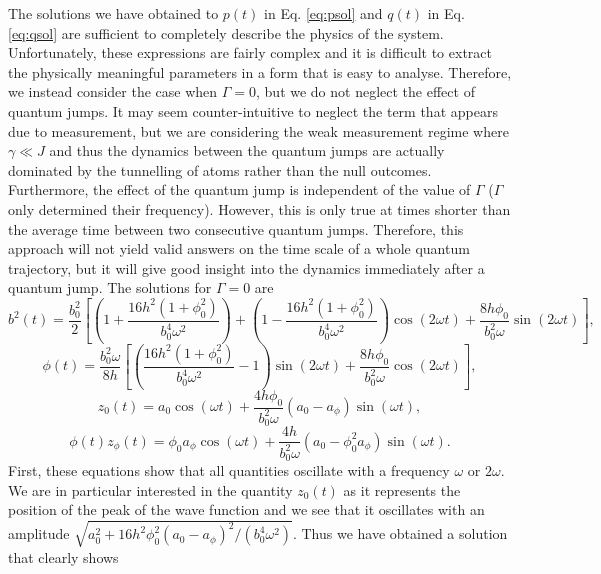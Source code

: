 The solutions we have obtained to $p(t)$ in Eq. \eqref{eq:psol} and
$q(t)$ in Eq. \eqref{eq:qsol} are sufficient to completely describe
the physics of the system. Unfortunately, these expressions are fairly
complex and it is difficult to extract the physically meaningful
parameters in a form that is easy to analyse. Therefore, we instead
consider the case when $\Gamma = 0$, but we do not neglect the effect
of quantum jumps. It may seem counter-intuitive to neglect the term
that appears due to measurement, but we are considering the weak
measurement regime where $\gamma \ll J$ and thus the
dynamics between the quantum jumps are actually dominated by the
tunnelling of atoms rather than the null outcomes. Furthermore, the
effect of the quantum jump is independent of the value of $\Gamma$
($\Gamma$ only determined their frequency). However, this is only true
at times shorter than the average time between two consecutive quantum
jumps. Therefore, this approach will not yield valid answers on the
time scale of a whole quantum trajectory, but it will give good
insight into the dynamics immediately after a quantum jump. The
solutions for $\Gamma = 0$ are
\begin{equation}
b^2(t) = \frac{b_0^2}{2} \left[ \left(1 + \frac{16 h^2 (1 + \phi_0^2)}
    {b_0^4 \omega^2} \right) + \left(1 - \frac{16 h^2 (1 + \phi_0^2)}
    {b_0^4 \omega^2} \right) \cos (2 \omega t) + \frac{8 h \phi_0}{b_0^2
    \omega} \sin(2 \omega t) \right],
\end{equation}
\begin{equation}
  \phi(t) = \frac{b_0^2 \omega} {8 h} \left[ \left( \frac{16 h^2 (1 + \phi_0^2)}
      {b_0^4 \omega^2} - 1 \right) \sin (2 \omega t) + \frac{8 h
      \phi_0} {b_0^2 \omega} \cos (2 \omega t) \right],
\end{equation}
\begin{equation}
  z_0(t) = a_0 \cos(\omega t) + \frac{4 h \phi_0} {b_0^2 \omega} (a_0 -
  a_\phi) \sin (\omega t),
\end{equation}
\begin{equation}
  \phi(t) z_\phi(t) = \phi_0 a_\phi \cos (\omega t)  + \frac{4 h}
  {b_0^2 \omega} (a_0 - \phi_0^2 a_\phi) \sin( \omega t).
\end{equation}
First, these equations show that all quantities oscillate with a
frequency $\omega$ or $2 \omega$. We are in particular interested in
the quantity $z_0(t)$ as it represents the position of the peak of the
wave function and we see that it oscillates with an amplitude
$\sqrt{a_0^2 + 16 h^2 \phi_0^2 (a_0 - a_\phi)^2 / (b_0^4
  \omega^2)}$. Thus we have obtained a solution that clearly shows
